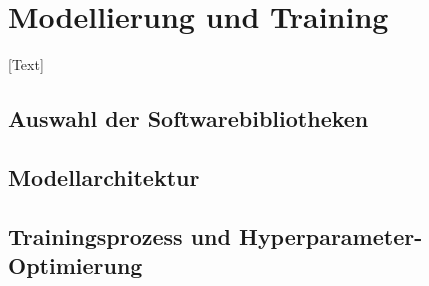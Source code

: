 \chapter{Modellierung und Training}\label{sec:model_train}
[Text]

\section{Auswahl der Softwarebibliotheken}

\section{Modellarchitektur}

\section{Trainingsprozess und Hyperparameter-Optimierung}
